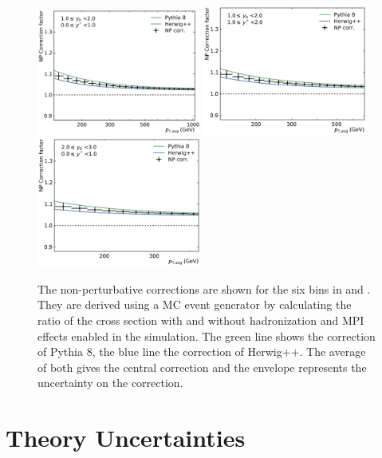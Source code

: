\begin{figure}[htp]
    \includegraphics[width=0.48\textwidth]{figures/theory/np_factors_calc_yb1ys0.pdf}
    \includegraphics[width=0.48\textwidth]{figures/theory/np_factors_calc_yb1ys1.pdf}\hfill
    \includegraphics[width=0.48\textwidth]{figures/theory/np_factors_calc_yb2ys0.pdf}
    \caption[Non-perturbative Corrections]{The non-perturbative corrections are
        shown for the six bins in \ystar and \yboost. They are derived using a MC event
        generator by calculating the ratio of the cross section with and without
        hadronization and MPI effects enabled in the simulation. The green line
        shows the correction of Pythia 8, the blue line the correction of
    Herwig++. The average of both gives the central correction and the envelope
represents the uncertainty on the correction.}
    \label{fig:np_factors}
\end{figure}

\section{Theory Uncertainties}

